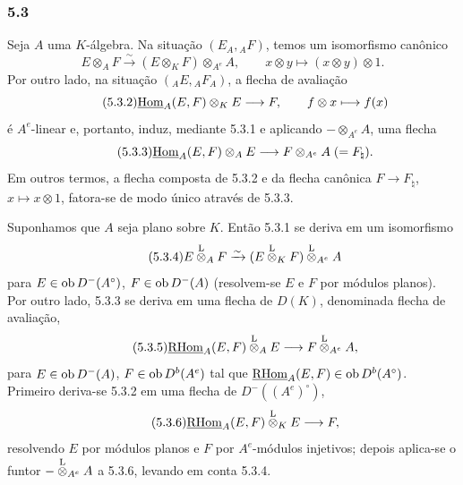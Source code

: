 \subsubsection*{5.3}

Seja $A$ uma $K$-álgebra. Na situação $(E_A,{}_AF)$, temos um isomorfismo canônico
\begin{equation}\tag{5.3.1}
E\otimes_AF\xrightarrow{\sim}(E\otimes_KF)\otimes_{A^e}A,
\qquad x\otimes y\longmapsto (x\otimes y)\otimes 1.
\end{equation}
Por outro lado, na situação $({}_AE,{}_AF_A)$, a flecha de avaliação
\begin{equation}\tag{5.3.2}
\underline{\operatorname{Hom}}_A(E,F)\otimes_KE\longrightarrow F,
\qquad f\otimes x\longmapsto f(x)
\end{equation}
é $A^e$-linear e, portanto, induz, mediante 5.3.1 e aplicando $-\otimes_{A^e}A$, uma flecha
\begin{equation}\tag{5.3.3}
\underline{\operatorname{Hom}}_A(E,F)\otimes_AE\longrightarrow F\otimes_{A^e}A\;(=F_\natural).
\end{equation}
Em outros termos, a flecha composta de 5.3.2 e da flecha canônica $F\to F_\natural$, $x\mapsto x\otimes 1$, fatora-se de modo único através de 5.3.3.

Suponhamos que $A$ seja plano sobre $K$. Então 5.3.1 se deriva em um isomorfismo
\begin{equation}\tag{5.3.4}
E\overset{\mathrm L}{\otimes}_AF\xrightarrow{\sim}(E\overset{\mathrm L}{\otimes}_KF)\overset{\mathrm L}{\otimes}_{A^e}A
\end{equation}
para $E\in\operatorname{ob} D^-(A^\circ)$, $F\in\operatorname{ob} D^-(A)$ (resolvem-se $E$ e $F$ por módulos planos). Por outro lado, 5.3.3 se deriva em uma flecha de $D(K)$, denominada flecha de avaliação,
\begin{equation}\tag{5.3.5}
\underline{\mathrm{RHom}}_A(E,F)\overset{\mathrm L}{\otimes}_AE\longrightarrow F\overset{\mathrm L}{\otimes}_{A^e}A,
\end{equation}
para $E\in\operatorname{ob} D^-(A)$, $F\in\operatorname{ob} D^b(A^e)$ tal que $\underline{\mathrm{RHom}}_A(E,F)\in\operatorname{ob} D^b(A^\circ)$. Primeiro deriva-se 5.3.2 em uma flecha de $D^-((A^e)^\circ)$,
\begin{equation}\tag{5.3.6}
\underline{\mathrm{RHom}}_A(E,F)\overset{\mathrm L}{\otimes}_KE\longrightarrow F,
\end{equation}
resolvendo $E$ por módulos planos e $F$ por $A^e$-módulos injetivos; depois aplica-se o funtor $-\overset{\mathrm L}{\otimes}_{A^e}A$ a 5.3.6, levando em conta 5.3.4.
